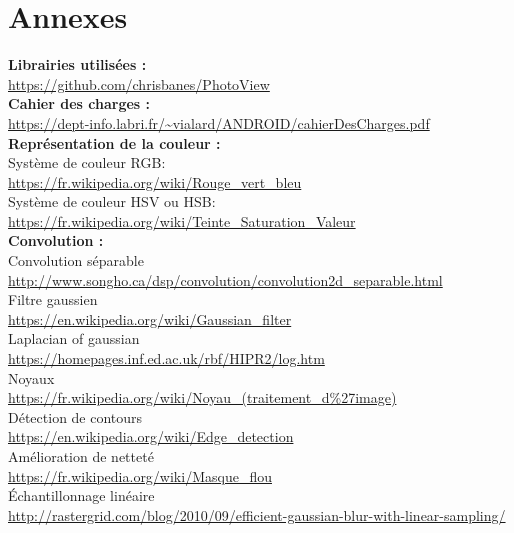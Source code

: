 \documentclass[12pt, a4paper]{article}
\begin{document}
\section{Annexes}

\textbf{Librairies utilisées :}
\\
\url{https://github.com/chrisbanes/PhotoView}
\\

\textbf{Cahier des charges :}
\\
\url{https://dept-info.labri.fr/~vialard/ANDROID/cahierDesCharges.pdf}
\\

\textbf{Représentation de la couleur :}
\\
Système de couleur RGB:
\\
\url{https://fr.wikipedia.org/wiki/Rouge_vert_bleu}
\\
Système de couleur HSV ou HSB:
\\
\url{https://fr.wikipedia.org/wiki/Teinte_Saturation_Valeur}
\\

\textbf{Convolution :}
\\
Convolution séparable \label{separable_source}
\\
\url{http://www.songho.ca/dsp/convolution/convolution2d_separable.html}
\\
Filtre gaussien \label{gauss_source}
\\
\url{https://en.wikipedia.org/wiki/Gaussian_filter}
\\
Laplacian of gaussian \label{LoG}
\\
\url{https://homepages.inf.ed.ac.uk/rbf/HIPR2/log.htm}
\\
Noyaux \label{kernel_source}
\\
\url{https://fr.wikipedia.org/wiki/Noyau_(traitement_d%27image)}
\\
Détection de contours \label{edge_source}
\\
\url{https://en.wikipedia.org/wiki/Edge_detection}
\\
Amélioration de netteté \label{sharpen_source}
\\
\url{https://fr.wikipedia.org/wiki/Masque_flou}
\\
Échantillonnage linéaire \label{linear_sampling}
\\
\url{http://rastergrid.com/blog/2010/09/efficient-gaussian-blur-with-linear-sampling/}
\\
\end{document}
